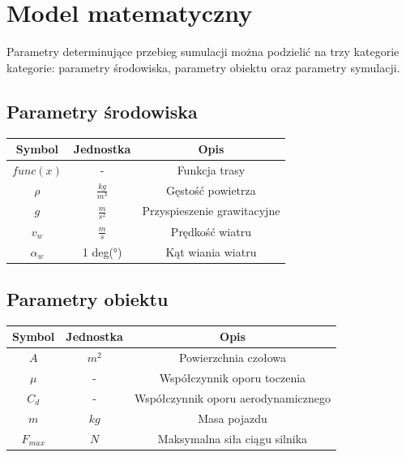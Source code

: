 \documentclass[12pt,a4paper]{article}
\begin{document}
	\section{Model matematyczny}
	Parametry determinujące przebieg sumulacji można podzielić na trzy kategorie kategorie: parametry środowiska, parametry obiektu oraz parametry symulacji.
	
	\subsection{Parametry środowiska}
		\begin{center}
			\begin{tabular}{|c|c|c|}
				\hline
				Symbol & Jednostka & Opis \\
				\hline
				\hline
				$func(x)$ & - & Funkcja trasy \\
				\hline
				$\rho$ & $\frac{kg}{m^3}$ & Gęstość powietrza \\
				\hline
				$g$ & $\frac{m}{s^2}$ & Przyspieszenie grawitacyjne\\
				\hline
				$v_w$ & $\frac{m}{s}$ & Prędkość wiatru \\
				\hline
				$\alpha_w$ & 1 deg(°) & Kąt wiania wiatru \\
				\hline
			\end{tabular}
		\end{center}
	
	\subsection{Parametry obiektu}
	\begin{center}
		\begin{tabular}{|c|c|c|}
			\hline
			Symbol & Jednostka & Opis \\
			\hline
			\hline
			$A$ & $m^2$ & Powierzchnia czołowa \\
			\hline
			$\mu$ & - & Współczynnik oporu toczenia \\
			\hline
			$C_d$ & - & Współczynnik oporu aerodynamicznego \\
			\hline
			$m$ & $kg$ & Masa pojazdu \\
			\hline
			$F_{max}$ & $N$ & Maksymalna siła ciągu silnika \\
			\hline
			
		\end{tabular}
	\end{center}
\end{document}
